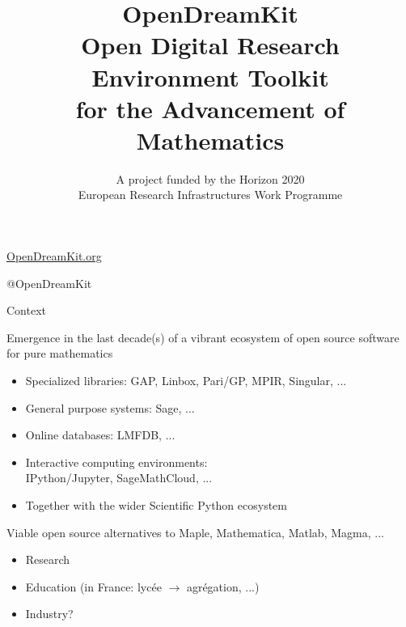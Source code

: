 \documentclass[
  usenames,svgnames, %
  compress,
  ]{beamer}
\title{{\huge \color{red} OpenDreamKit}\\
  Open Digital Research Environment Toolkit\\
  for the Advancement of Mathematics\\}
\subtitle{A project funded by the Horizon 2020\\
  European Research Infrastructures Work Programme}
\begin{document}
\begin{frame}
  \maketitle

  \Huge
  \centerline{\url{OpenDreamKit.org}}
  \centerline{@OpenDreamKit}
  
\end{frame}


\begin{frame}{Context}
  \begin{block}{Emergence in the last decade(s) of a vibrant ecosystem
      of open source software for pure mathematics}

    \begin{itemize}
    \item Specialized libraries: GAP, Linbox, Pari/GP, MPIR, Singular,
      ...
    \item General purpose systems: Sage, ...
    \item Online databases: LMFDB, ...
    \item Interactive computing environments:\\
      IPython/Jupyter, SageMathCloud, ...
    \item Together with the wider Scientific Python ecosystem
    \end{itemize}
  \end{block}
  \pause
  \bigskip

  \begin{block}{Viable open source alternatives to Maple, Mathematica,
      Matlab, Magma, ...}
    \begin{itemize}
    \item Research
    \item Education (in France: lycée $\longrightarrow$ agrégation, ...)
    \item Industry?
    \end{itemize}
  \end{block}
\end{frame}
\end{document}
